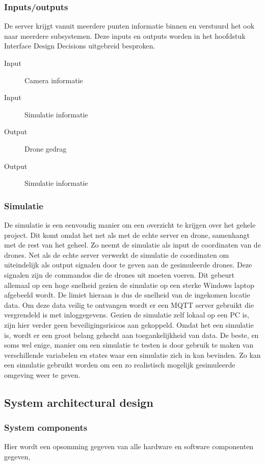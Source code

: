\subsubsection*{Inputs/outputs}
De server krijgt vanuit meerdere punten informatie binnen en verstuurd het ook naar meerdere subsystemen.
Deze inputs en outputs worden in het hoofdstuk Interface Design Decisions uitgebreid besproken.


\begin{description}
    \item[Input] Camera informatie
    \item[Input] Simulatie informatie
    \item[Output] Drone gedrag
    \item[Output] Simulatie informatie
\end{description}

\subsubsection{Simulatie}
De simulatie is een eenvoudig manier om een overzicht te krijgen over het gehele project. Dit komt omdat het net als met de echte server en drone, samenhangt met de rest van het geheel. Zo neemt de simulatie als input de coordinaten van de drones. Net als de echte server verwerkt de simulatie de coordinaten om uiteindelijk als output signalen door te geven aan de gesimuleerde drones. Deze signalen zijn de commandos die de drones uit moeten voeren. Dit gebeurt allemaal op een hoge snelheid gezien de simulatie op een sterke Windows laptop afgebeeld wordt. De limiet hieraan is dus de snelheid van de ingekomen locatie data. Om deze data veilig te ontvangen wordt er een MQTT server gebruikt die vergrendeld is met inloggegevens. Gezien de simulatie zelf lokaal op een PC is, zijn hier verder geen beveiligingsrisicos aan gekoppeld. Omdat het een simulatie is, wordt er een groot belang gehecht aan toegankelijkheid van data. De beste, en soms wel enige, manier om een simulatie te testen is door gebruik te maken van verschillende variabelen en states waar een simulatie zich in kan bevinden. Zo kan een simulatie gebruikt worden om een zo realistisch mogelijk gesimuleerde omgeving weer te geven.


\subsection{System architectural design}

\subsubsection{System components}
Hier wordt een opsomming gegeven van alle hardware en software componenten gegeven, 

